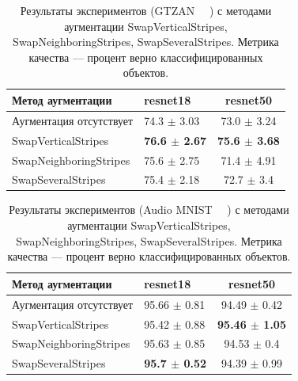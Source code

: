 \documentclass[12pt, fleqn]{article}
\begin{document}
\begin{table}[ht!]
    \centering
	\begin{tabular}{| l | l | c |}
    	\hline
	    Метод аугментации & resnet18 & resnet50 \\ \hline
	    Аугментация отсутствует  & 74.3 $\pm$ 3.03 & 73.0 $\pm$ 3.24 \\ \hline
	    SwapVerticalStripes & \textbf{76.6 $\pm$ 2.67} & \textbf{75.6 $\pm$ 3.68} \\ \hline
	    SwapNeighboringStripes & 75.6 $\pm$ 2.75 & 71.4 $\pm$ 4.91 \\ \hline
	    SwapSeveralStripes & 75.4 $\pm$ 2.18 & 72.7 $\pm$ 3.4 \\ \hline
	\end{tabular}
	\caption{Результаты экспериментов (GTZAN ~\cite{GTZAN_Article}~\cite{GTZAN_kaggle}) с методами аугментации SwapVerticalStripes, SwapNeighboringStripes, SwapSeveralStripes. Метрика качества --- процент верно классифицированных объектов.}
	\label{table:lukianov_pavel_t3}
\end{table}

\begin{table}[ht!]
    \centering
	\begin{tabular}{| l | l | c |}
    	\hline
	    Метод аугментации & resnet18 & resnet50 \\ \hline
	    Аугментация отсутствует  & 95.66 $\pm$ 0.81 & 94.49 $\pm$ 0.42 \\ \hline
	    SwapVerticalStripes & 95.42 $\pm$ 0.88 & \textbf{95.46 $\pm$  1.05} \\ \hline
	    SwapNeighboringStripes & 95.63 $\pm$ 0.85 & 94.53 $\pm$ 0.4 \\ \hline
	    SwapSeveralStripes & \textbf{95.7 $\pm$ 0.52} & 94.39 $\pm$ 0.99 \\ \hline
	\end{tabular}
	\caption{Результаты экспериментов (Audio MNIST ~\cite{AudioMnistArticle}~\cite{AudioMnistKaggle}) с методами аугментации SwapVerticalStripes, SwapNeighboringStripes, SwapSeveralStripes. Метрика качества --- процент верно классифицированных объектов.}
	\label{table:lukianov_pavel_t4}
\end{table}

\newpage
\end{document}
